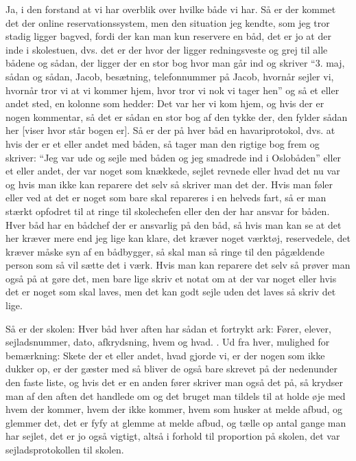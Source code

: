 Ja, i den forstand at vi har overblik over hvilke både vi har. 
Så er der kommet det der online reservationssystem, men den situation jeg kendte, som jeg tror stadig ligger bagved, fordi der kan man kun reservere en båd, det er jo at der inde i skolestuen, dvs. det er der hvor der ligger redningsveste og grej til alle bådene og sådan, der ligger der en stor bog hvor man går ind og skriver ``3. maj, sådan og sådan, Jacob, besætning, telefonnummer på Jacob, hvornår sejler vi, hvornår tror vi at vi kommer hjem, hvor tror vi nok vi tager hen'' og så et eller andet sted, en kolonne som hedder: Det var her vi kom hjem, og hvis der er nogen kommentar, så det er sådan en stor bog af den tykke der, den fylder sådan her [viser hvor står bogen er]. 
Så er der på hver båd en havariprotokol, dvs. at hvis der er et eller andet med båden, så tager man den rigtige bog frem og skriver: ``Jeg var ude og sejle med båden og jeg smadrede ind i Oslobåden'' eller et eller andet, der var noget som knækkede, sejlet revnede eller hvad det nu var og hvis man ikke kan reparere det selv så skriver man det der. 
Hvis man føler eller ved at det er noget som bare skal repareres i en helveds fart, så er man stærkt opfodret til at ringe til skolechefen eller den der har ansvar for båden. 
Hver båd har en bådchef der er ansvarlig på den båd, så hvis man kan se at det her kræver mere end jeg lige kan klare, det kræver noget værktøj, reservedele, det kræver måske syn af en bådbygger, så skal man så ringe til den pågældende person som så vil sætte det i værk. 
Hvis man kan reparere det selv så prøver man også på at gøre det, men bare lige skriv et notat om at der var noget eller hvis det er noget som skal laves, men det kan godt sejle uden det laves så skriv det lige. 

Så er der skolen: Hver båd hver aften har sådan et fortrykt ark: Fører, elever, sejladsnummer, dato, afkrydsning, hvem og hvad. 
. 
Ud fra hver, mulighed for bemærkning: Skete der et eller andet, hvad gjorde vi, er der nogen som ikke dukker op, er der gæster med så bliver de også bare skrevet på der nedenunder den faste liste, og hvis det er en anden fører skriver man også det på, så krydser man af den aften det handlede om og det bruget man tildels til at holde øje med hvem der kommer, hvem der ikke kommer, hvem som husker at melde afbud, og glemmer det, det er fyfy at glemme at melde afbud, og tælle op antal gange man har sejlet, det er jo også vigtigt, altså i forhold til proportion på skolen, det var sejladsprotokollen til skolen. 

